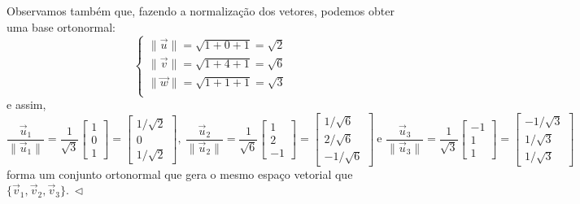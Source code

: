 \begin{ex}
Observamos também que, fazendo a normalização dos vetores, podemos obter uma base ortonormal:
\begin{equation}
\left\{
  \begin{array}{ll}
   \|\vec{u}\| = \sqrt{1 + 0 + 1} = \sqrt{2} \\
   \|\vec{v}\| = \sqrt{1 + 4 + 1} = \sqrt{6} \\
   \|\vec{w}\| = \sqrt{1 + 1 + 1} = \sqrt{3} \\
  \end{array}
\right.
\end{equation} e assim,
\begin{equation}
\frac{\vec{u}_1}{\|\vec{u}_1\|} = \frac{1}{\sqrt{3}}
\begin{bmatrix}
1 \\ 0 \\ 1
\end{bmatrix} =
\begin{bmatrix}
1/\sqrt{2} \\ 0 \\ 1/\sqrt{2}
\end{bmatrix}, \
\frac{\vec{u}_2}{\|\vec{u}_2\|} = \frac{1}{\sqrt{6}}
\begin{bmatrix}
1 \\ 2 \\ -1
\end{bmatrix} =
\begin{bmatrix}
1/\sqrt{6} \\ 2/\sqrt{6} \\ -1/\sqrt{6}
\end{bmatrix} \ \text{e }
\frac{\vec{u}_3}{\|\vec{u}_3\|} = \frac{1}{\sqrt{3}}
\begin{bmatrix}
-1 \\ 1 \\ 1
\end{bmatrix} =
\begin{bmatrix}
-1/\sqrt{3} \\ 1/\sqrt{3} \\ 1/\sqrt{3}
\end{bmatrix}
\end{equation} forma um conjunto ortonormal que gera o mesmo espaço vetorial que $\{ \vec{v}_1, \vec{v}_2, \vec{v}_3 \}. \ \lhd$
\end{ex}



